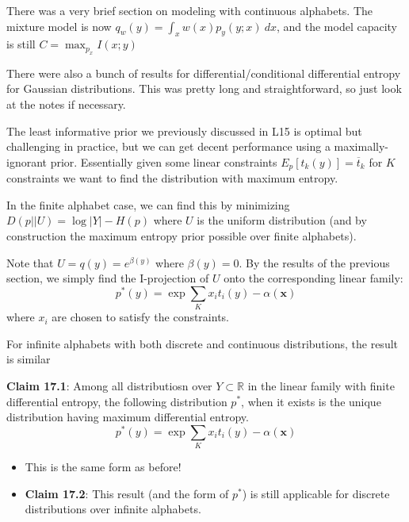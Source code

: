 \documentclass[12pt]{article} %
\begin{document}
\separate

There was a very brief section on modeling with continuous alphabets. The mixture model is now $q_w(y) = \int_x w(x) p_y(y;x) \ dx$, and the model capacity is still $C = \max_{p_x} I(x;y)$

There were also a bunch of results for differential/conditional differential entropy for Gaussian distributions. This was pretty long and straightforward, so just look at the notes if necessary.


\newpage
{}
The least informative prior we previously discussed in L15 is optimal but challenging in practice, but we can get decent performance using a maximally-ignorant prior. Essentially given some linear constraints $E_p[t_k(y)] = \overline{t}_k$ for $K$ constraints we want to find the distribution with maximum entropy.

In the finite alphabet case, we can find this by minimizing $D(p||U) = \log|Y| - H(p)$ where $U$ is the uniform distribution (and by construction the maximum entropy prior possible over finite alphabets).

Note that $U = q(y) = e^{\beta(y)}$ where $\beta(y) = 0$. By the results of the previous section, we simply find the I-projection of $U$ onto the corresponding linear family:
\begin{equation*}
    p^*(y) = \exp{\sum_K x_i t_i(y) - \alpha(\mathbf{x})}
\end{equation*}
where $x_i$ are chosen to satisfy the constraints.

\separate

For infinite alphabets with both discrete and continuous distributions, the result is similar

\textbf{Claim 17.1}: Among all distributiosn over $Y \subset \mathbb{R}$ in the linear family with finite differential entropy, the following distribution $p^*$, when it exists is the unique distribution having maximum differential entropy.
\begin{equation*}
    p^*(y) = \exp{\sum_K x_i t_i(y) - \alpha(\mathbf{x})}
\end{equation*}
\begin{itemize}[topsep=-1pt, itemsep=-1pt]
    \item This is the same form as before!
    \item \textbf{Claim 17.2}: This result (and the form of $p^*$) is still applicable for discrete distributions over infinite alphabets.
\end{itemize}
\end{document}
